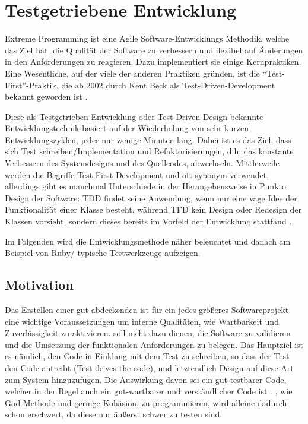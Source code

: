 \chapter{Testgetriebene Entwicklung}
\label{sec:tdd}

Extreme Programming ist eine Agile Software-Entwicklungs Methodik, welche das Ziel hat, die Qualität der Software zu verbessern und flexibel auf Änderungen in den Anforderungen zu reagieren. Dazu implementiert sie einige Kernpraktiken. Eine Wesentliche, auf der viele der anderen Praktiken gründen, ist die "`Test-First"'-Praktik, die ab 2002 durch Kent Beck als Test-Driven-Development bekannt geworden ist \citep{beck_test_2002}.

Diese als Testgetrieben Entwicklung oder Test-Driven-Design bekannte Entwicklungstechnik basiert auf der Wiederholung von sehr kurzen Entwicklungszyklen, jeder nur wenige Minuten lang. Dabei ist es das Ziel, dass sich Test schreiben/Implementation und Refaktorisierungen, d.h. das konstante Verbessern des Systemdesigns und des Quellcodes, abwechseln. Mittlerweile werden die Begriffe Test-First Development und  oft synonym verwendet, allerdings gibt es manchmal Unterschiede in der Herangehensweise in Punkto Design der Software: TDD findet seine Anwendung, wenn nur eine vage Idee der Funktionalität einer Klasse besteht, während TFD kein Design oder Redesign der Klassen vorsieht, sondern dieses bereits im Vorfeld der Entwicklung stattfand \citep{stackoverflow_testing_2008}.

Im Folgenden wird die Entwicklungsmethode  näher beleuchtet und danach am Beispiel von Ruby/ typische Testwerkzeuge aufzeigen.
\section{Motivation}
  Das Erstellen einer gut-abdeckenden  ist für ein jedes größeres Softwareprojekt eine wichtige Voraussetzungen um interne Qualitäten, wie Wartbarkeit und Zuverlässigkeit zu aktivieren.  soll nicht dazu dienen, die Software zu validieren und die Umsetzung der funktionalen Anforderungen zu belegen. Das Hauptziel ist es nämlich, den Code in Einklang mit dem Test zu schreiben, so dass der Test den Code antreibt (Test drives the code), und letztendlich Design auf diese Art zum System hinzuzufügen. Die Auswirkung davon sei ein gut-testbarer Code, welcher in der Regel auch ein gut-wartbarer und verständlicher Code ist \citep{beck_test_2002}. , wie God-Methode und geringe Kohäsion, zu programmieren, wird alleine dadurch schon erschwert, da diese nur äußerst schwer zu testen sind.

